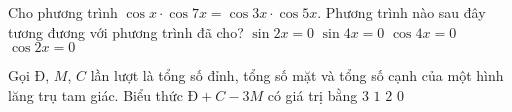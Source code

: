 \begin{ex}%
	Cho phương trình $\cos x\cdot\cos 7x=\cos 3x\cdot\cos 5x$. Phương trình nào sau đây tương đương với phương trình đã cho? 
	\choice
	{$\sin 2x=0$}
	{\True $\sin 4x=0$}
	{$\cos 4x=0$}
	{$\cos 2x=0$}
\end{ex}

\begin{ex}%
	Gọi $\textit{Đ}$, $M$, $C$ lần lượt là tổng số đỉnh, tổng số mặt và tổng số cạnh của một hình lăng trụ tam giác. Biểu thức $\textit{Đ}+C-3M$ có giá trị bằng 
	\choice
	{$3$}
	{$1$}
	{$2$}
	{\True $0$}
\end{ex}

